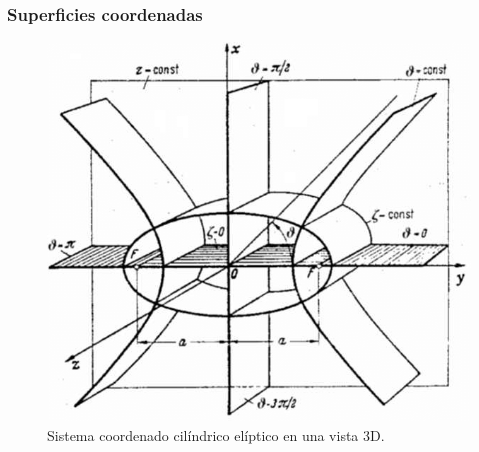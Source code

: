 \begin{frame}
\frametitle{Superficies coordenadas}
\begin{figure}[H]
    \centering
    \includegraphics[scale=0.3]{Imagenes/Elliptic-cylindrical-coordinates_02.png}
    \caption{Sistema coordenado cilíndrico elíptico en una vista 3D.}
    \label{fig:figura_coordenada_cilindricas_elipticas_3D}
\end{figure}
\end{frame}
